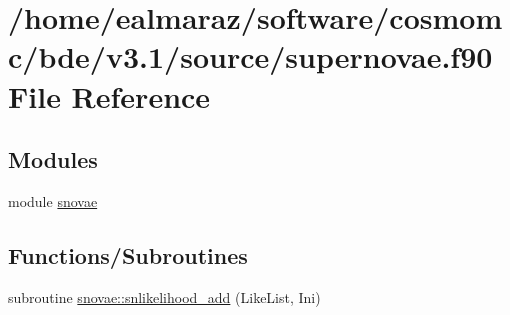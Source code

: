 \hypertarget{supernovae_8f90}{}\section{/home/ealmaraz/software/cosmomc/bde/v3.1/source/supernovae.f90 File Reference}
\label{supernovae_8f90}
\subsection*{Modules}
\begin{DoxyCompactItemize}
\item 
module \mbox{\hyperlink{namespacesnovae}{snovae}}
\end{DoxyCompactItemize}
\subsection*{Functions/\+Subroutines}
\begin{DoxyCompactItemize}
\item 
subroutine \mbox{\hyperlink{namespacesnovae_adb4b4cd7d74239d328c3ab34bb17b6eb}{snovae\+::snlikelihood\+\_\+add}} (Like\+List, Ini)
\end{DoxyCompactItemize}

